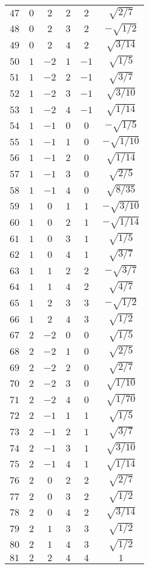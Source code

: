 \begin{table}
\begin{center}
\begin{tabular}{|c|c|c|c|c|c|}
$47$ & $0$ & $2$ & $2$ & $2$ & $\sqrt{2/7}$ \\ 
$48$ & $0$ & $2$ & $3$ & $2$ & $-\sqrt{1/2}$ \\ 
$49$ & $0$ & $2$ & $4$ & $2$ & $\sqrt{3/14}$ \\ 
$50$ & $1$ & $-2$ & $1$ & $-1$ & $\sqrt{1/5}$ \\ 
$51$ & $1$ & $-2$ & $2$ & $-1$ & $\sqrt{3/7}$ \\ 
$52$ & $1$ & $-2$ & $3$ & $-1$ & $\sqrt{3/10}$ \\ 
$53$ & $1$ & $-2$ & $4$ & $-1$ & $\sqrt{1/14}$ \\ 
$54$ & $1$ & $-1$ & $0$ & $0$ & $-\sqrt{1/5}$ \\ 
$55$ & $1$ & $-1$ & $1$ & $0$ & $-\sqrt{1/10}$ \\ 
$56$ & $1$ & $-1$ & $2$ & $0$ & $\sqrt{1/14}$ \\ 
$57$ & $1$ & $-1$ & $3$ & $0$ & $\sqrt{2/5}$ \\ 
$58$ & $1$ & $-1$ & $4$ & $0$ & $\sqrt{8/35}$ \\ 
$59$ & $1$ & $0$ & $1$ & $1$ & $-\sqrt{3/10}$ \\ 
$60$ & $1$ & $0$ & $2$ & $1$ & $-\sqrt{1/14}$ \\ 
$61$ & $1$ & $0$ & $3$ & $1$ & $\sqrt{1/5}$ \\ 
$62$ & $1$ & $0$ & $4$ & $1$ & $\sqrt{3/7}$ \\ 
$63$ & $1$ & $1$ & $2$ & $2$ & $-\sqrt{3/7}$ \\ 
$64$ & $1$ & $1$ & $4$ & $2$ & $\sqrt{4/7}$ \\ 
$65$ & $1$ & $2$ & $3$ & $3$ & $-\sqrt{1/2}$ \\ 
$66$ & $1$ & $2$ & $4$ & $3$ & $\sqrt{1/2}$ \\ 
$67$ & $2$ & $-2$ & $0$ & $0$ & $\sqrt{1/5}$ \\ 
$68$ & $2$ & $-2$ & $1$ & $0$ & $\sqrt{2/5}$ \\ 
$69$ & $2$ & $-2$ & $2$ & $0$ & $\sqrt{2/7}$ \\ 
$70$ & $2$ & $-2$ & $3$ & $0$ & $\sqrt{1/10}$ \\ 
$71$ & $2$ & $-2$ & $4$ & $0$ & $\sqrt{1/70}$ \\ 
$72$ & $2$ & $-1$ & $1$ & $1$ & $\sqrt{1/5}$ \\ 
$73$ & $2$ & $-1$ & $2$ & $1$ & $\sqrt{3/7}$ \\ 
$74$ & $2$ & $-1$ & $3$ & $1$ & $\sqrt{3/10}$ \\ 
$75$ & $2$ & $-1$ & $4$ & $1$ & $\sqrt{1/14}$ \\ 
$76$ & $2$ & $0$ & $2$ & $2$ & $\sqrt{2/7}$ \\ 
$77$ & $2$ & $0$ & $3$ & $2$ & $\sqrt{1/2}$ \\ 
$78$ & $2$ & $0$ & $4$ & $2$ & $\sqrt{3/14}$ \\ 
$79$ & $2$ & $1$ & $3$ & $3$ & $\sqrt{1/2}$ \\ 
$80$ & $2$ & $1$ & $4$ & $3$ & $\sqrt{1/2}$ \\ 
$81$ & $2$ & $2$ & $4$ & $4$ & $1$ \\ 
\hline 
\end{tabular}
\end{center}
\end{table}

